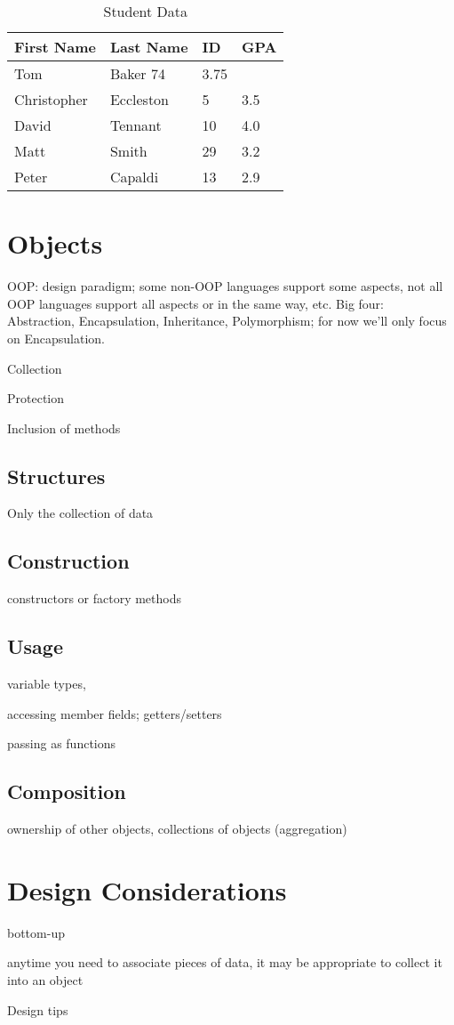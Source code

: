 \begin{table}
\centering
\begin{tabular}{|l|l|l|l|}
\hline
First Name & Last Name & ID & GPA \\
\hline\hline
Tom & Baker 74 & 3.75 \\
\hline
Christopher & Eccleston & 5 & 3.5 \\
\hline
David & Tennant & 10 & 4.0 \\
\hline
Matt & Smith & 29 & 3.2 \\
\hline
Peter & Capaldi & 13 & 2.9 \\
\hline
\end{tabular}
\caption{Student Data}
\label{table:studentData}
\end{table}

\section{Objects}

OOP: design paradigm; some non-OOP languages support some aspects, 
not all OOP languages support all aspects or in the same way, etc.
Big four: Abstraction, Encapsulation, Inheritance, Polymorphism; 
for now we'll only focus on Encapsulation.

Collection

Protection

Inclusion of methods

\subsection{Structures}

Only the collection of data

\subsection{Construction}

constructors or factory methods

\subsection{Usage}

variable types, 

accessing member fields; getters/setters 

passing as functions

\subsection{Composition}

ownership of other objects, collections of objects (aggregation) 

\section{Design Considerations}

bottom-up

anytime you need to associate pieces of data, it may be appropriate to 
collect it into an object

Design tips


